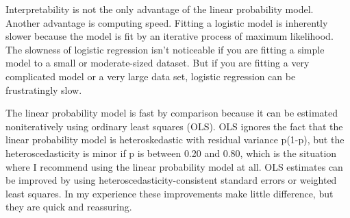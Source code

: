 \documentclass[sigconf]{acmart}
\begin{document}
\par
Interpretability is not the only advantage of the linear probability model. Another advantage is computing speed. Fitting a logistic model is inherently slower because the model is fit by an iterative process of maximum likelihood\cite{C3}. The slowness of logistic regression isn’t noticeable if you are fitting a simple model to a small or moderate-sized dataset. But if you are fitting a very complicated model or a very large data set, logistic regression can be frustratingly slow.

\par
The linear probability model is fast by comparison because it can be estimated noniteratively using ordinary least squares (OLS). OLS ignores the fact that the linear probability model is heteroskedastic with residual variance p(1-p), but the heteroscedasticity is minor if p is between 0.20 and 0.80, which is the situation where I recommend using the linear probability model at all. OLS estimates can be improved by using heteroscedasticity-consistent standard errors or weighted least squares\cite{C3}. In my experience these improvements make little difference, but they are quick and reassuring.


 
\end{document}
